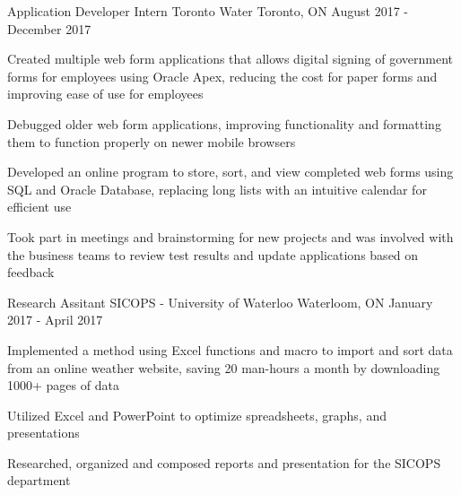 \begin{cventries}
  \cventry
    {Application Developer Intern}
    {Toronto Water}
    {Toronto, ON}
    {August 2017 - December 2017}
    {
      \begin{cvitems}
        \item {Created multiple web form applications that allows digital signing of government forms for employees using Oracle Apex, reducing the cost for paper forms and improving ease of use for employees}
        \item {Debugged older web form applications, improving functionality and formatting them to function properly on newer mobile browsers}
        \item {Developed an online program to store, sort, and view completed web forms using SQL and Oracle Database, replacing long lists with an intuitive calendar for efficient use}
        \item {Took part in meetings and brainstorming for new projects and was involved with the business teams to review test results and update applications based on feedback
        }
      \end{cvitems}
    }
  \cventry
    {Research Assitant}
    {SICOPS - University of Waterloo}
    {Waterloom, ON}
    {January 2017 - April 2017}
    {
      \begin{cvitems}
        \item {Implemented a method using Excel functions and macro to import and sort data from an online weather website, saving 20 man-hours a month by downloading 1000+ pages of data}
        \item {Utilized Excel and PowerPoint to optimize spreadsheets, graphs, and presentations}
        \item {Researched, organized and composed reports and presentation for the SICOPS department
        }
      \end{cvitems}
    }
\end{cventries}


